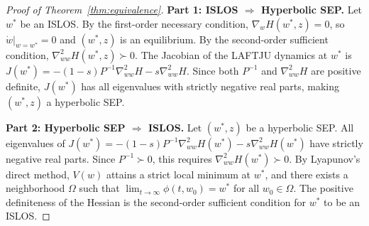 \documentclass[10pt,twocolumn]{article}
\newcommand{\method}{LAFTJU}
\begin{document}
\begin{proof}[Proof of Theorem~\ref{thm:equivalence}]
\textbf{Part 1: ISLOS $\Rightarrow$ Hyperbolic SEP.}
Let $w^*$ be an ISLOS. By the first-order necessary condition, $\nabla_w H(w^*,z) = 0$, so $\dot{w}|_{w=w^*} = 0$ and $(w^*,z)$ is an equilibrium. By the second-order sufficient condition, $\nabla^2_{ww} H(w^*,z) \succ 0$. The Jacobian of the \method{} dynamics at $w^*$ is $J(w^*) = -(1-s)P^{-1}\nabla^2_{ww}H - s\nabla^2_{ww}H$. Since both $P^{-1}$ and $\nabla^2_{ww}H$ are positive definite, $J(w^*)$ has all eigenvalues with strictly negative real parts, making $(w^*,z)$ a hyperbolic SEP.

\textbf{Part 2: Hyperbolic SEP $\Rightarrow$ ISLOS.}
Let $(w^*,z)$ be a hyperbolic SEP. All eigenvalues of $J(w^*) = -(1-s)P^{-1}\nabla^2_{ww}H(w^*) - s\nabla^2_{ww}H(w^*)$ have strictly negative real parts. Since $P^{-1} \succ 0$, this requires $\nabla^2_{ww}H(w^*) \succ 0$. By Lyapunov's direct method, $V(w)$ attains a strict local minimum at $w^*$, and there exists a neighborhood $\Omega$ such that $\lim_{t\to\infty}\phi(t,w_0) = w^*$ for all $w_0 \in \Omega$. The positive definiteness of the Hessian is the second-order sufficient condition for $w^*$ to be an ISLOS.
\end{proof}
\end{document}
